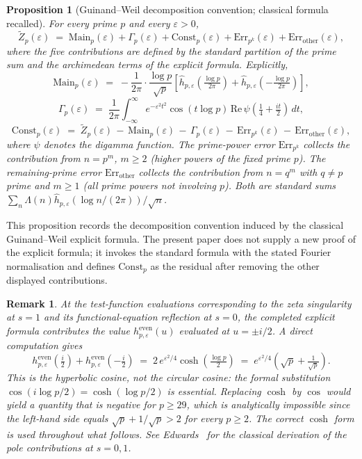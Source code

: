 \documentclass[11pt]{article}
\newtheorem{proposition}[theorem]{Proposition}
\newtheorem*{remark}{Remark}
\begin{document}
\begin{proposition}[Guinand--Weil decomposition convention; classical formula recalled]
\label{prop:gw}
For every prime $p$ and every $\varepsilon>0$,
\[
\widetilde Z_p(\varepsilon) \;=\; \mathrm{Main}_p(\varepsilon)
                       + \Gamma_p(\varepsilon)
                       + \mathrm{Const}_p(\varepsilon)
                       + \mathrm{Err}_{p^k}(\varepsilon)
                       + \mathrm{Err}_{\mathrm{other}}(\varepsilon),
\]
where the five contributions are defined by the standard partition of
the prime sum and the archimedean terms of the explicit formula.
Explicitly,
\[
\mathrm{Main}_p(\varepsilon) \;=\; -\frac{1}{2\pi}\cdot\frac{\log p}{\sqrt p}
\!\left[\widehat{h}_{p,\varepsilon}\!\left(\tfrac{\log p}{2\pi}\right)
      +\widehat{h}_{p,\varepsilon}\!\left(-\tfrac{\log p}{2\pi}\right)
\right],
\]
\[
\Gamma_p(\varepsilon) \;=\; \frac{1}{2\pi}\int_{-\infty}^{\infty}
e^{-\varepsilon^2 t^2}\cos(t\log p)\,
\mathrm{Re}\,\psi\!\left(\tfrac14 + \tfrac{it}{2}\right)\,dt,
\]
\[
\mathrm{Const}_p(\varepsilon) \;=\; \widetilde Z_p(\varepsilon)
\,-\, \mathrm{Main}_p(\varepsilon)
\,-\, \Gamma_p(\varepsilon)
\,-\, \mathrm{Err}_{p^k}(\varepsilon)
\,-\, \mathrm{Err}_{\mathrm{other}}(\varepsilon),
\]
where $\psi$ denotes the digamma function.
The prime-power error $\mathrm{Err}_{p^k}$ collects the contribution
from $n=p^m$, $m\ge 2$ (higher powers of the fixed prime $p$).
The remaining-prime error $\mathrm{Err}_{\mathrm{other}}$ collects
the contribution from $n=q^m$ with $q\ne p$ prime and $m\ge 1$
(all prime powers not involving $p$).
Both are standard sums
$\sum_n\Lambda(n)\widehat{h}_{p,\varepsilon}(\log n/(2\pi))/\sqrt n$.
\end{proposition}

This proposition records the decomposition convention induced by the
classical Guinand--Weil explicit formula. The present paper does not
supply a new proof of the explicit formula; it invokes the standard
formula with the stated Fourier normalisation and defines
$\mathrm{Const}_p$ as the residual after removing the other displayed
contributions.

\begin{remark}
At the test-function evaluations corresponding to the zeta
singularity at $s=1$ and its functional-equation reflection at
$s=0$, the completed explicit formula contributes the value
$h^{\mathrm{even}}_{p,\varepsilon}(u)$ evaluated at $u=\pm i/2$.
A direct computation gives
\[
h^{\mathrm{even}}_{p,\varepsilon}\!\left(\tfrac{i}{2}\right)
+ h^{\mathrm{even}}_{p,\varepsilon}\!\left(-\tfrac{i}{2}\right)
\;=\; 2\,e^{\varepsilon^2/4}\cosh\!\left(\tfrac{\log p}{2}\right)
\;=\; e^{\varepsilon^2/4}\!\left(\sqrt p + \tfrac{1}{\sqrt p}\right).
\]
This is the hyperbolic cosine, not the circular cosine: the formal
substitution $\cos(i\log p/2)=\cosh(\log p/2)$ is essential.
Replacing $\cosh$ by $\cos$ would yield a quantity that is negative
for $p\ge 29$, which is analytically impossible since the left-hand
side equals $\sqrt p + 1/\sqrt p>2$ for every $p\ge 2$.
The correct $\cosh$ form is used throughout what follows.
See Edwards~\cite[\S1.8, \S1.16, and \S3.6]{Edwards} for the classical derivation
of the pole contributions at $s=0,1$.
\end{remark}
\end{document}
